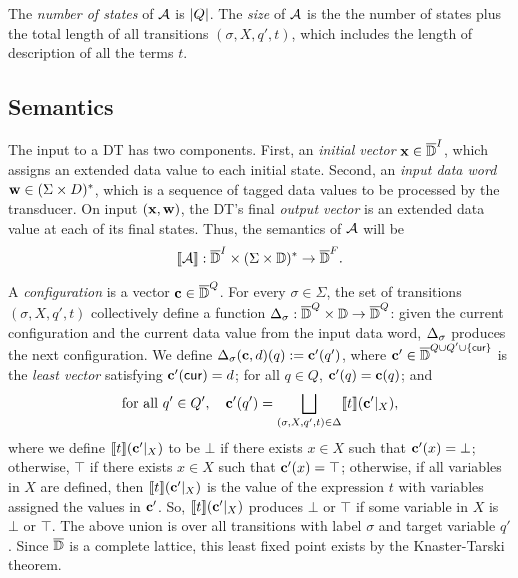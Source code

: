 The \emph{number of states} of $\mathcal{A}$ is $|Q|$.
The \emph{size} of $\mathcal{A}$ is the the number of states plus the total length of all transitions
$(\sigma, X, q', t)$, which includes the length of description of all the terms $t$.

\subsection{Semantics}
\label{dt:subsec:dt-semantics}

The input to a DT has two components.
First, an \emph{initial vector} $\mathbf{x} \in \overline{\mathbb{D}{}}^I$, which assigns an extended data value to each initial state. Second, an \emph{input data word} $\mathbf{w} \in (\Sigma \times D)^*$, which is a sequence of tagged data values to be processed by the transducer. On input $(\mathbf{x},\mathbf{w})$, the DT's final \emph{output vector} is an extended data value at each of its final states.
Thus, the semantics of $\mathcal{A}$ will be
\[
\llbracket \mathcal{A} \rrbracket : \overline{\mathbb{D}{}}^I \times (\Sigma \times \mathbb{D})^* \to \overline{\mathbb{D}{}}^F.
\]

A \emph{configuration} is a vector $\mathbf{c} \in \overline{\mathbb{D}{}}^Q$.
For every $\sigma \in \Sigma$, the set of transitions $(\sigma, X, q', t)$
collectively define a function $\Delta_\sigma : \overline{\mathbb{D}{}}^Q \times \mathbb{D} \to \overline{\mathbb{D}{}}^Q$:
given the current configuration and the current data value from the input data word,
$\Delta_\sigma$ produces the next configuration.
We define $\Delta_\sigma(\mathbf{c},d)(q) := \mathbf{c}'(q')$,
where $\mathbf{c}' \in \overline{\mathbb{D}{}}^{Q \cup Q' \cup \{\mathsf{cur}\}}$ is the \emph{least vector} satisfying
$\mathbf{c}'(\mathsf{cur}) = d$; for all $q \in Q$, $\mathbf{c}'(q) = \mathbf{c}(q)$;
and
\begin{equation}
\text{for all }q' \in Q',\quad
\mathbf{c}'(q') = \bigsqcup_{(\sigma, X, q', t) \in \Delta} \llbracket t \rrbracket(\mathbf{c}'|_X),
\label{dt:eq:fixpoint-semantics}
\end{equation}
where we define $\llbracket t \rrbracket(\mathbf{c}'|_X)$ to be $\bot$ if there exists $x \in X$ such that $\mathbf{c}'(x) = \bot$; otherwise, $\top$ if there exists $x \in X$ such that $\mathbf{c}'(x) = \top$; otherwise, if all variables in $X$ are defined, then $\llbracket t \rrbracket(\mathbf{c}'|_X)$ is the value of the expression $t$ with variables assigned the values in $\mathbf{c}'$.
So, $\llbracket t \rrbracket(\mathbf{c}'|_X)$ produces $\bot$ or $\top$ if some variable in $X$ is $\bot$ or $\top$.
The above union is over all transitions with label $\sigma$ and target variable $q'$.
Since $\overline{\mathbb{D}{}}$ is a complete lattice, this least fixed point exists by the Knaster-Tarski theorem.

